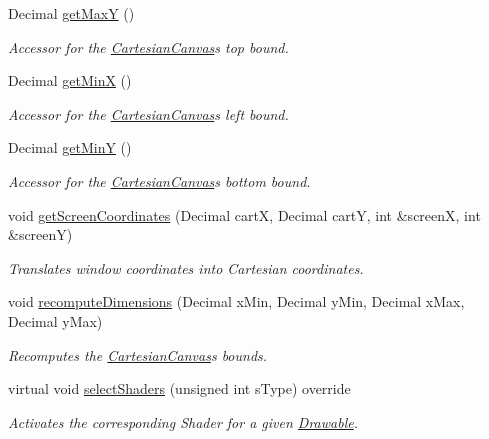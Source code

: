 \begin{DoxyCompactItemize}
Decimal \hyperlink{classtsgl_1_1_cartesian_canvas_a68c0616f8180690423d39e9e83045b8c}{get\+MaxY} ()
\begin{DoxyCompactList}\small\item\em Accessor for the \hyperlink{classtsgl_1_1_cartesian_canvas}{Cartesian\+Canvas}\textquotesingle{}s top bound. \end{DoxyCompactList}\item 
Decimal \hyperlink{classtsgl_1_1_cartesian_canvas_a4ab031c60f6fed675e8163c30c01e5d6}{get\+MinX} ()
\begin{DoxyCompactList}\small\item\em Accessor for the \hyperlink{classtsgl_1_1_cartesian_canvas}{Cartesian\+Canvas}\textquotesingle{}s left bound. \end{DoxyCompactList}\item 
Decimal \hyperlink{classtsgl_1_1_cartesian_canvas_a99c935c99c9a29f2cc918963d734d9a6}{get\+MinY} ()
\begin{DoxyCompactList}\small\item\em Accessor for the \hyperlink{classtsgl_1_1_cartesian_canvas}{Cartesian\+Canvas}\textquotesingle{}s bottom bound. \end{DoxyCompactList}\item 
void \hyperlink{classtsgl_1_1_cartesian_canvas_a8fea34cfcee9bc577c1e1ab6d28a8185}{get\+Screen\+Coordinates} (Decimal cartX, Decimal cartY, int \&screenX, int \&screenY)
\begin{DoxyCompactList}\small\item\em Translates window coordinates into Cartesian coordinates. \end{DoxyCompactList}\item 
void \hyperlink{classtsgl_1_1_cartesian_canvas_ac833a44fe7367f6411292707de37beef}{recompute\+Dimensions} (Decimal x\+Min, Decimal y\+Min, Decimal x\+Max, Decimal y\+Max)
\begin{DoxyCompactList}\small\item\em Recomputes the \hyperlink{classtsgl_1_1_cartesian_canvas}{Cartesian\+Canvas}\textquotesingle{}s bounds. \end{DoxyCompactList}\item 
virtual void \hyperlink{classtsgl_1_1_cartesian_canvas_aecbcfe36e70b77e04ed9df68088b4ff5}{select\+Shaders} (unsigned int s\+Type) override
\begin{DoxyCompactList}\small\item\em Activates the corresponding Shader for a given \hyperlink{classtsgl_1_1_drawable}{Drawable}. \end{DoxyCompactList}\item 

\end{DoxyCompactItemize}
